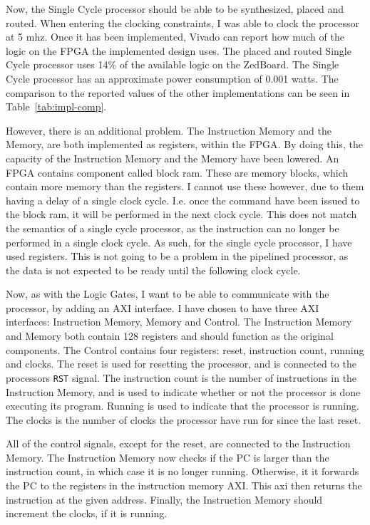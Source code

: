 Now, the Single Cycle processor should be able to be synthesized, placed and
routed. When entering the clocking constraints, I was able to clock the
processor at 5 mhz. Once it has been implemented, Vivado can report how much of
the logic on the FPGA the implemented design uses. The placed and routed Single
Cycle processor uses 14\% of the available logic on the ZedBoard. The Single
Cycle processor has an approximate power consumption of 0.001 watts. The
comparison to the reported values of the other implementations can be seen in
Table~\ref{tab:impl-comp}.

However, there is an additional problem. The Instruction Memory and the Memory,
are both implemented as registers, within the FPGA. By doing this, the capacity
of the Instruction Memory and the Memory have been lowered.  An FPGA contains
component called block ram. These are memory blocks, which contain more memory
than the registers. I cannot use these however, due to them having a delay of a
single clock cycle. I.e. once the command have been issued to the block ram, it
will be performed in the next clock cycle. This does not match the semantics of
a single cycle processor, as the instruction can no longer be performed in a
single clock cycle. As such, for the single cycle processor, I have used
registers. This is not going to be a problem in the pipelined processor, as the
data is not expected to be ready until the following clock cycle.

Now, as with the Logic Gates, I want to be able to communicate with the
processor, by adding an AXI interface. I have chosen to have three AXI
interfaces: Instruction Memory, Memory and Control. The Instruction Memory and
Memory both contain 128 registers and should function as the original
components. The Control contains four registers: reset, instruction count,
running and clocks. The reset is used for resetting the processor, and is
connected to the processors \texttt{RST} signal. The instruction count is the
number of instructions in the Instruction Memory, and is used to indicate
whether or not the processor is done executing its program. Running is used to
indicate that the processor is running. The clocks is the number of clocks the
processor have run for since the last reset.

All of the control signals, except for the reset, are connected to the
Instruction Memory. The Instruction Memory now checks if the PC is larger
than the instruction count, in which case it is no longer running. Otherwise, it
it forwards the PC to the registers in the instruction memory AXI. This axi
then returns the instruction at the given address. Finally, the
Instruction Memory should increment the clocks, if it is running.

